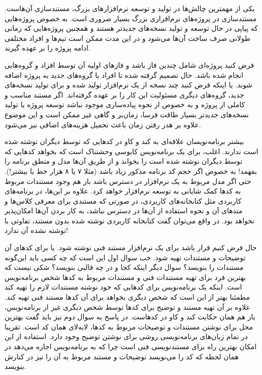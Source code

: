 یکی از مهمترین چالش‌ها در تولید و توسعه نرم‌افزارهای بزرگ، مستندسازی آن‌هاست.
مستندسازی در پروژه‌های نرم‌افزاری بزرگ بسیار ضروری است. به خصوص پروژه‌هایی که
پیاپی در حال توسعه و تولید نسخه‌های جدیدتر هستند و همچنین پروژه‌هایی که زمانی
طولانی صرف ساخت آن‌ها می‌شود و در این مدت ممکن است تیم‌ها و افراد مختلفی ادامه
پروژه را بر عهده گیرند.

فرض کنید پروژه‌ای شامل چندین فاز باشد و فازهای اولیه آن توسط افراد و گروه‌هایی
انجام شده باشد. حال تصمیم گرفته شده تا افراد یا گروه‌های جدید به پروژه اضافه
شوند. یا اینکه فرض کنید چند نسخه از یک نرم‌افزار تولید شده و برای تولید نسخه‌های
جدید، گروه‌های دیگری مسئولیت این کار را بر عهده گرفته‌اند. اگر مستند مناسب و
کاملی از پروژه و به خصوص از نحوه پیاده‌سازی موجود نباشد توسعه پروژه یا تولید
نسخه‌های جدیدتر بسیار طاقت فرسا، زمان‌بر و گاهی غیر ممکن است و این موضوع علاوه بر هدر
رفتن زمان باعث تحمیل هزینه‌های اضافی نیز می‌شود.

بیشتر برنامه‌نویسان علاقه‌ای به کند و کاو در کدهایی که توسط دیگران نوشته شده است
ندارند. اغلب، برای یک برنامه‌نویس کابوسی وحشتناک است که بخواهد کدهایی که توسط
دیگران نوشته شده است را بخواند و از طریق آن‌ها مدل و منطق برنامه را بفهمد! به
خصوص اگر حجم کد برنامه مذکور زیاد باشد (مثلا ۷ یا ۸ هزار خط یا بیشتر!). حتی اگر
مدل مربوط به یک نرم‌افزار در دسترس باشد باز هم وجود مستندات مربوط به کدها کمک
شایانی به توسعه نرم‌افزار خواهد کرد.
علاوه بر این‌ها، در برنامه‌های کاربردی مثل کتابخانه‌های کاربردی، در صورتی که
مستندی برای معرفی کلاس‌ها و متدهای آن و نحوه استفاده از آن‌ها در دسترس نباشد، به
کار بردن آن‌ها امکان‌پذیر نخواهد بود. در واقع می‌توان گفت کتابخانه کاربردی نوشته
شده بدون مستند، تفاوتی با نوشته نشده آن ندارد!

حال فرض کنیم قرار باشد برای یک نرم‌افزار مستند فنی نوشته شود. یا برای کدهای آن
توضیحات و مستندات تهیه شود.
خب سوال اول این است که چه کسی باید این‌گونه مستندات را بنویسد؟ سوال دیگر اینکه
کجا و در چه قالبی بنویسد؟ شکی نیست که بهترین فرد برای تهیه مستندات فنی و مستندات
مربوط به کدها شخص برنامه‌نویس است. اینکه یک برنامه‌نویس برای کدهایی که خود نوشته
مستندات لازم را تهیه کند مطمئنا بهتر از این است که شخص دیگری بخواهد برای آن کدها
مستند فنی تهیه کند. علاوه بر آن تهیه مستند و توضیح برای کدها توسط شخص دیگری غیر
از برنامه‌نویس، باز هم همان حکایت کند و کاو در کدهاست. در پاسخ به سوال دوم نیز
باید گفت بهترین محل برای نوشتن مستندات و توضیحات مربوط به کدها، لابه‌لای همان کد
است. تقریبا در تمام زبان‌های برنامه‌نویسی روشی برای نوشتن توضیح وجود دارد.
استفاده از این امکان بهترین راه برای مستندنویسی فنی است چرا که به برنامه‌نویس
اجازه می‌دهد در همان لحظه که کد را می‌نویسد توضیحات و مستند مربوط به آن را نیز
در کنارش بنویسد.


